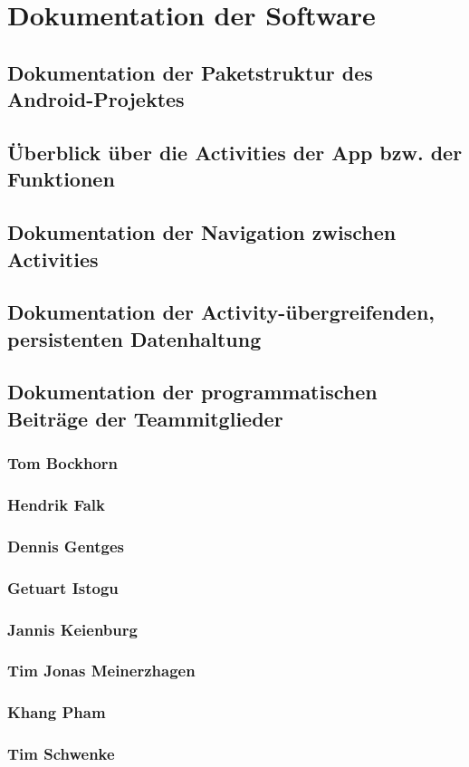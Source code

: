 \section{Dokumentation der Software}

\subsection{Dokumentation der Paketstruktur des Android-Projektes}

\subsection{Überblick über die Activities der App bzw. der Funktionen}

\subsection{Dokumentation der Navigation zwischen Activities}

\subsection{Dokumentation der Activity-übergreifenden, persistenten Datenhaltung}

\subsection{Dokumentation der programmatischen Beiträge der Teammitglieder}

\subsubsection{Tom Bockhorn}

\subsubsection{Hendrik Falk}

\subsubsection{Dennis Gentges}

\subsubsection{Getuart Istogu}

\subsubsection{Jannis Keienburg}

\subsubsection{Tim Jonas Meinerzhagen}

\subsubsection{Khang Pham}

\subsubsection{Tim Schwenke}





